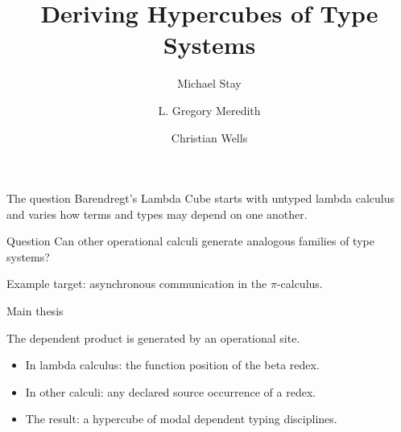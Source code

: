\documentclass[aspectratio=169,11pt]{beamer}
\title[Operational hypercubes]{Deriving Hypercubes of Type Systems}
\author[Stay, Meredith, Wells]{Michael Stay \and L. Gregory Meredith \and Christian Wells}
\date{}
\begin{document}
\begin{frame}
  \titlepage
\end{frame}

\begin{frame}{The question}
\large
Barendregt's Lambda Cube starts with untyped lambda calculus and varies how terms and types may depend on one another.

\vspace{0.8em}
\begin{block}{Question}
Can other operational calculi generate analogous families of type systems?
\end{block}

\vspace{0.4em}
Example target: asynchronous communication in the \(\pi\)-calculus.
\end{frame}

\begin{frame}{Main thesis}
\begin{center}
\Large The dependent product is generated by an \alert{operational site}.
\end{center}

\vspace{0.8em}
\begin{itemize}
  \item In lambda calculus: the function position of the beta redex.
  \item In other calculi: any declared source occurrence of a redex.
  \item The result: a hypercube of modal dependent typing disciplines.
\end{itemize}
\end{frame}
\end{document}
